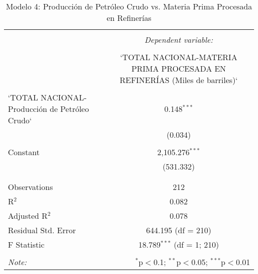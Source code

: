 
\begin{table}[!htbp] \centering 
  \caption{Modelo 4: Producción de Petróleo Crudo vs. Materia Prima Procesada en Refinerías} 
  \label{} 
\begin{tabular}{@{\extracolsep{5pt}}lc} 
\\[-1.8ex]\hline 
\hline \\[-1.8ex] 
 & \multicolumn{1}{c}{\textit{Dependent variable:}} \\ 
\cline{2-2} 
\\[-1.8ex] & `TOTAL NACIONAL-MATERIA PRIMA PROCESADA EN REFINERÍAS (Miles de barriles)` \\ 
\hline \\[-1.8ex] 
 `TOTAL NACIONAL-Producción de Petróleo Crudo` & 0.148$^{***}$ \\ 
  & (0.034) \\ 
  & \\ 
 Constant & 2,105.276$^{***}$ \\ 
  & (531.332) \\ 
  & \\ 
\hline \\[-1.8ex] 
Observations & 212 \\ 
R$^{2}$ & 0.082 \\ 
Adjusted R$^{2}$ & 0.078 \\ 
Residual Std. Error & 644.195 (df = 210) \\ 
F Statistic & 18.789$^{***}$ (df = 1; 210) \\ 
\hline 
\hline \\[-1.8ex] 
\textit{Note:}  & \multicolumn{1}{r}{$^{*}$p$<$0.1; $^{**}$p$<$0.05; $^{***}$p$<$0.01} \\ 
\end{tabular} 
\end{table} 
